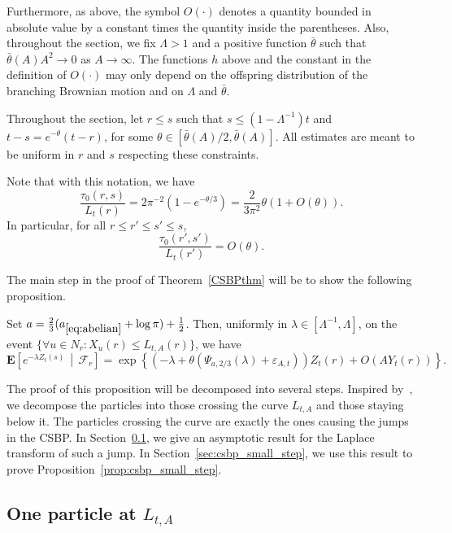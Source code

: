 \documentclass[AHL,Unicode,longabstracts,published]{cedram}
\newcommand*\eps{\varepsilon}
\newcommand*\E{\mathbf{E}}
\newcommand\F{\mathcal{F}}
\newcommand{\1} {\mathds{1}}
\renewcommand*\to{\rightarrow}
\let\oldforall\forall
\renewcommand*{\forall}{\mathrel{\oldforall}}
\begin{document}
Furthermore, as above, the symbol $O(\cdot)$ denotes a quantity bounded in absolute value by a constant times the quantity inside the parentheses. Also, throughout the section, we fix $\Lambda > 1$ and a positive function $\bar\theta$ such that $\bar\theta(A)A^2\to 0$ as $A\to\infty$. The functions $h$ above and the constant in the definition of $O(\cdot)$ may only depend on the offspring distribution of the branching Brownian motion and on $\Lambda$ and $\bar{\theta}$.

Throughout the section, let $r\le s$ such that $s\le (1-\Lambda^{-1})t$ and $t-s=e^{-\theta}(t-r)$, for some $\theta\in [\bar\theta(A)/2,\bar\theta(A)]$. All estimates are meant to be uniform in $r$ and $s$ respecting these constraints.

Note that with this notation, we have
\begin{equation}\label{26}
\frac{\tau_0(r,s) }{ L_t(r)} =2\pi^{-2} \left(1-e^{-\theta/3}\right) = \frac2{3\pi^{2}}\theta \left(1 + O(\theta)\right).
\end{equation}
In particular, for all $r\le r'\le s'\le s$,
\begin{equation}\label{27}
\frac{\tau_0\left(r',s'\right) }{ L_t(r')} =O(\theta).
\end{equation}

The main step in the proof of Theorem~\ref{CSBPthm} will be to show the following proposition.

\begin{prop}\label{prop:csbp_small_step}
Set $a=\frac{2}{3}(a_{\eqref{eq:abelian}}+\log \pi)+\frac{1}{2}$. Then, uniformly in $\lambda\in [\Lambda^{-1},\Lambda]$, on the event $\{\forall u\in N_r: X_u(r) \le L_{t,A}(r)\}$, we have
\[
\E\left[e^{-\lambda Z_t(s)}\,\middle|\,\F_r\right] = \exp\left\{\left(-\lambda + \theta \left(\Psi_{a,2/3}(\lambda)+\eps_{A,t}\right)\right)Z_t(r) + O\left(AY_t(r)\right)\right\}.
\]
\end{prop}

The proof of this proposition will be decomposed into several steps. Inspired by~\cite{bbs2}, we decompose the particles into those crossing the curve $L_{t,A}$ and those staying below it. The particles crossing the curve are exactly the ones causing the jumps in the CSBP. In Section~\ref{sec:csbp_jump}, we give an asymptotic result for the Laplace transform of such a jump. In Section~\ref{sec:csbp_small_step}, we use this result to prove Proposition~\ref{prop:csbp_small_step}.

\subsection{One particle at \texorpdfstring{$L_{t,A}$}{L\_\{t,A\}}}\label{sec:csbp_jump}
\end{document}
